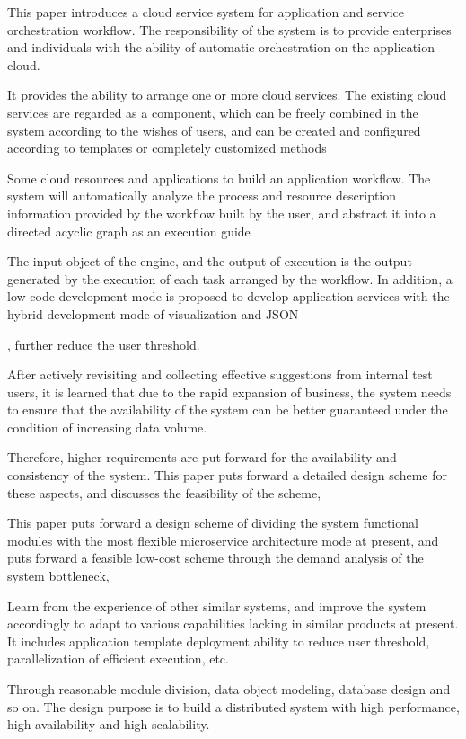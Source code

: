 \begin{abstract*}
  This paper introduces a cloud service system for application and service orchestration workflow. The responsibility of the system is to provide enterprises and individuals with the ability of automatic orchestration on the application cloud.

  It provides the ability to arrange one or more cloud services. The existing cloud services are regarded as a component, which can be freely combined in the system according to the wishes of users, and can be created and configured according to templates or completely customized methods

  Some cloud resources and applications to build an application workflow. The system will automatically analyze the process and resource description information provided by the workflow built by the user, and abstract it into a directed acyclic graph as an execution guide

  The input object of the engine, and the output of execution is the output generated by the execution of each task arranged by the workflow. In addition, a low code development mode is proposed to develop application services with the hybrid development mode of visualization and JSON

  , further reduce the user threshold.

  After actively revisiting and collecting effective suggestions from internal test users, it is learned that due to the rapid expansion of business, the system needs to ensure that the availability of the system can be better guaranteed under the condition of increasing data volume.

  Therefore, higher requirements are put forward for the availability and consistency of the system. This paper puts forward a detailed design scheme for these aspects, and discusses the feasibility of the scheme,

  This paper puts forward a design scheme of dividing the system functional modules with the most flexible microservice architecture mode at present, and puts forward a feasible low-cost scheme through the demand analysis of the system bottleneck,

  Learn from the experience of other similar systems, and improve the system accordingly to adapt to various capabilities lacking in similar products at present. It includes application template deployment ability to reduce user threshold, parallelization of efficient execution, etc.

  Through reasonable module division, data object modeling, database design and so on. The design purpose is to build a distributed system with high performance, high availability and high scalability.

\end{abstract*}
